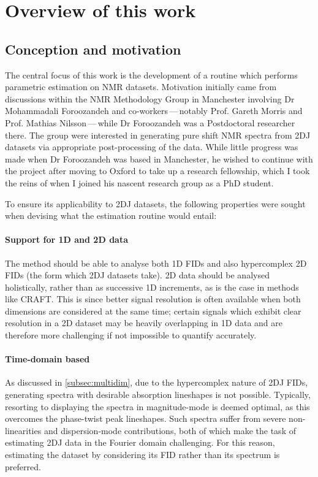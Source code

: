 \section{Overview of this work}

\subsection{Conception and motivation}
The central focus of this work is the development of a routine which performs
parametric estimation on \ac{NMR} datasets.
Motivation initially came from discussions within the NMR
Methodology Group in Manchester involving
Dr Mohammadali Foroozandeh and co-workers\,---\,notably Prof.
Gareth Morris and Prof. Mathias Nilsson\,---\,while Dr Foroozandeh was a
Postdoctoral researcher there. The group were interested in generating pure
shift \ac{NMR} spectra from \ac{2DJ} datasets via appropriate post-processing
of the data.  While little progress was made when Dr Foroozandeh was based in
Manchester, he wished to continue with the project after moving to Oxford to
take up a research fellowship, which I took the reins of when I joined his
nascent research group as a PhD student.

To ensure its applicability to \ac{2DJ} datasets, the following properties were
sought when devising what the estimation routine would entail:

\paragraph{Support for \ac{1D} and \ac{2D} data}
The method should be able to analyse both \ac{1D} \acp{FID} and also
hypercomplex \ac{2D} \acp{FID} (the form which \ac{2DJ} datasets take).
\ac{2D} data should be analysed holistically,
rather than as successive \ac{1D} increments, as is the case in methods like
\ac{CRAFT}\cite{Krishnamurthy2017}. This is since
better signal resolution is often available when both dimensions are
considered at the same time; certain signals which exhibit clear resolution in a
\ac{2D} dataset may be heavily overlapping in \ac{1D} data and are
therefore more challenging if not impossible to quantify accurately.

\paragraph{Time-domain based}
As discussed in \cref{subsec:multidim}, due to the hypercomplex nature of
\ac{2DJ} \acp{FID}, generating spectra with desirable absorption lineshapes is
not possible. Typically, resorting to displaying the spectra in magnitude-mode is
deemed optimal, as this overcomes the phase-twist peak lineshapes. Such
spectra suffer from severe non-linearities and dispersion-mode contributions,
both of which make the task of estimating \ac{2DJ} data in the Fourier domain
challenging. For this reason, estimating the dataset by considering its \ac{FID}
rather than its spectrum is preferred.

